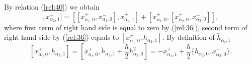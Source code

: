 \documentclass[english]{elsarticle}
\numberwithin{equation}{section}
\begin{document}
By relation (\ref{rel:40}) we obtain
\begin{equation}
[[x_{\alpha_1,0}^+,x_{\alpha_2,0}^+],x_{\alpha_2,1}^-]= [[x_{\alpha_1,0}^+,x_{\alpha_2,0}^-],x_{\alpha_2,1}^+]+[x_{\alpha_1,0}^+,[x_{\alpha_2,0}^+,x_{\alpha_2,0}^-]],
\end{equation}
where first term of right hand side  is equal to zero by (\ref{rel:36}), second term of right hand side by (\ref{rel:36}) equals to $[x_{\alpha_1,0}^+,h_{\alpha_2,1}]$. By definition of $\tilde{h}_{\alpha_i,1}$
\begin{equation}
\label{rel:101}
[x_{\alpha_i,0}^+,h_{\alpha_2,1}]=[x_{\alpha_i,0}^+,\tilde{h}_{\alpha_2,1}+ \frac{\hbar}{2}h_{\alpha_2,0}^2]=-x_{\alpha_1,1}^++\frac{\hbar}{2}\{h_{\alpha_2,0},x_{\alpha_2,0}^+\}.
\end{equation}
\end{document}
